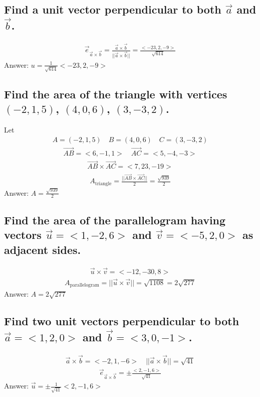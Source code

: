 \documentclass{article}
\begin{document}
\subsection{Find a unit vector perpendicular to both $\vec{a}$ and $\vec{b}$.}
\begin{align*}
	\vec{e}_{\vec{a} \times \vec{b}} = \frac{\vec{a} \times \vec{b}}{|| \vec{a} \times \vec{b} ||} = \frac{<-23, 2, -9>}{\sqrt{614}}
\end{align*}
Answer: $u = \frac{1}{\sqrt{614}}<-23, 2, -9>$

\subsection{Find the area of the triangle with vertices $(-2, 1, 5)$, $(4, 0, 6)$, $(3, -3, 2)$.}
Let
\begin{align*}
	A = (-2, 1, 5) \quad B = (4, 0, 6) \quad C = (3, -3, 2)
\end{align*}
\begin{align*}
	\vec{AB} = <6, -1, 1> \quad \vec{AC} = <5, -4, -3>
\end{align*}
\begin{align*}
	\vec{AB} \times \vec{AC} = <7, 23, -19>
\end{align*}
\begin{align*}
	A_{\text{triangle}} = \frac{|| \vec{AB} \times \vec{AC} ||}{2} = \frac{\sqrt{939}}{2}
\end{align*}
Answer: $A = \frac{\sqrt{939}}{2}$

\subsection{Find the area of the parallelogram having vectors $\vec{u} = <1, -2, 6>$ and $\vec{v} = <-5, 2, 0>$ as adjacent sides.}
\begin{align*}
	\vec{u} \times \vec{v} = <-12, -30, 8>
\end{align*}
\begin{align*}
	A_{\text{parallelogram}} = || \vec{u} \times \vec{v} || = \sqrt{1108} = 2\sqrt{277}
\end{align*}
Answer: $A = 2\sqrt{277}$

\subsection{Find two unit vectors perpendicular to both $\vec{a} = <1, 2, 0>$ and $\vec{b} = <3, 0, -1>$.}
\begin{align*}
	\vec{a} \times \vec{b} = <-2, 1, -6> \quad || \vec{a} \times \vec{b} || = \sqrt{41}
\end{align*}
\begin{align*}
	\vec{e}_{\vec{a} \times \vec{b}} = \pm \frac{<2, -1, 6>}{\sqrt{41}}
\end{align*}
Answer: $\vec{u} = \pm \frac{1}{\sqrt{41}}<2, -1, 6>$
\end{document}
